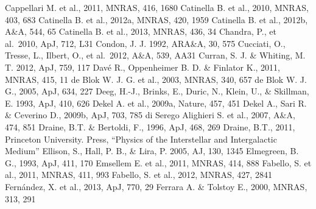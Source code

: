 \begin{thebibliography}{99}
\begin{multicols}{2}
{	Cappellari M. et al., 2011, MNRAS, 416, 1680
	Catinella B. et al., 2010, MNRAS, 403, 683
	Catinella B. et al., 2012a, MNRAS, 420, 1959
	Catinella B. et al., 2012b, A\&A, 544, 65
	Catinella B. et al., 2013, MNRAS, 436, 34
   	 Chandra, P., et al.\ 2010, ApJ, 712, L31
 	Condon, J. J. 1992, ARA\&A, 30, 575
	Cucciati, O., Tresse, L., Ilbert, O., et al.\ 2012, A\&A, 539, AA31 
	Curran, S. J. \& Whiting, M. T. 2012, ApJ, 759, 117
	Dav\'{e} R., Oppenheimer B. D. \& Finlator K., 2011, MNRAS, 415, 11
	de Blok W. J. G. et al., 2003, MNRAS, 340, 657
	de Blok W. J. G., 2005, ApJ, 634, 227
    	Deeg, H.-J., Brinks, E., Duric, N., Klein, U., \& Skillman, E. 1993, ApJ, 410, 626
	Dekel A. et al., 2009a, Nature, 457, 451
	Dekel A., Sari R. \& Ceverino D., 2009b, ApJ, 703, 785
	di Serego Alighieri S. et al., 2007, A\&A, 474, 851
	Draine, B.T. \& Bertoldi, F., 1996, ApJ, 468, 269
	Draine, B.T., 2011, Princeton University. Press, ``Physics of the Interstellar and Intergalactic Medium''
    	Ellison, S.,  Hall, P. B., \& Lira, P. 2005, AJ, 130, 1345
	Elmegreen, B. G., 1993, ApJ, 411, 170
	Emsellem E. et al., 2011, MNRAS, 414, 888
	Fabello, S. et al., 2011, MNRAS, 411, 993
	Fabello, S. et al., 2012, MNRAS, 427, 2841
	Fern{\'a}ndez, X. et al., 2013, ApJ, 770, 29
	Ferrara A. \& Tolstoy E., 2000, MNRAS, 313, 291
}
\end{multicols}
\end{thebibliography}

